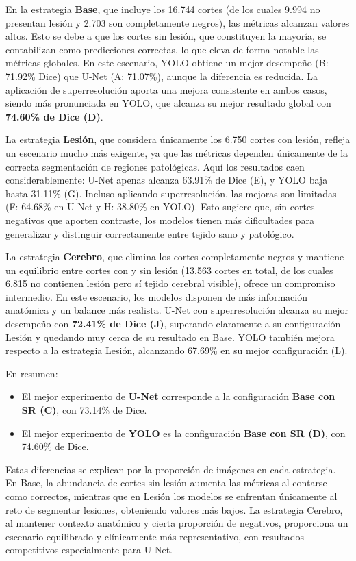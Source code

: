 \documentclass[../main.tex]{subfiles}
\begin{document}
En la estrategia \textbf{Base}, que incluye los 16.744 cortes (de los cuales 9.994 no presentan lesión y 2.703 son completamente negros), las métricas alcanzan valores altos. Esto se debe a que los cortes sin lesión, que constituyen la mayoría, se contabilizan como predicciones correctas, lo que eleva de forma notable las métricas globales. En este escenario, YOLO obtiene un mejor desempeño (B: 71.92\% Dice) que U-Net (A: 71.07\%), aunque la diferencia es reducida. La aplicación de superresolución aporta una mejora consistente en ambos casos, siendo más pronunciada en YOLO, que alcanza su mejor resultado global con \textbf{74.60\% de Dice (D)}.

La estrategia \textbf{Lesión}, que considera únicamente los 6.750 cortes con lesión, refleja un escenario mucho más exigente, ya que las métricas dependen únicamente de la correcta segmentación de regiones patológicas. Aquí los resultados caen considerablemente: U-Net apenas alcanza 63.91\% de Dice (E), y YOLO baja hasta 31.11\% (G). Incluso aplicando superresolución, las mejoras son limitadas (F: 64.68\% en U-Net y H: 38.80\% en YOLO). Esto sugiere que, sin cortes negativos que aporten contraste, los modelos tienen más dificultades para generalizar y distinguir correctamente entre tejido sano y patológico.

La estrategia \textbf{Cerebro}, que elimina los cortes completamente negros y mantiene un equilibrio entre cortes con y sin lesión (13.563 cortes en total, de los cuales 6.815 no contienen lesión pero sí tejido cerebral visible), ofrece un compromiso intermedio. En este escenario, los modelos disponen de más información anatómica y un balance más realista. U-Net con superresolución alcanza su mejor desempeño con \textbf{72.41\% de Dice (J)}, superando claramente a su configuración Lesión y quedando muy cerca de su resultado en Base. YOLO también mejora respecto a la estrategia Lesión, alcanzando 67.69\% en su mejor configuración (L).

En resumen:
\begin{itemize}
    \item El mejor experimento de \textbf{U-Net} corresponde a la configuración \textbf{Base con SR (C)}, con 73.14\% de Dice.
    \item El mejor experimento de \textbf{YOLO} es la configuración \textbf{Base con SR (D)}, con 74.60\% de Dice.
\end{itemize}

Estas diferencias se explican por la proporción de imágenes en cada estrategia. En Base, la abundancia de cortes sin lesión aumenta las métricas al contarse como correctos, mientras que en Lesión los modelos se enfrentan únicamente al reto de segmentar lesiones, obteniendo valores más bajos. La estrategia Cerebro, al mantener contexto anatómico y cierta proporción de negativos, proporciona un escenario equilibrado y clínicamente más representativo, con resultados competitivos especialmente para U-Net.
\end{document}
